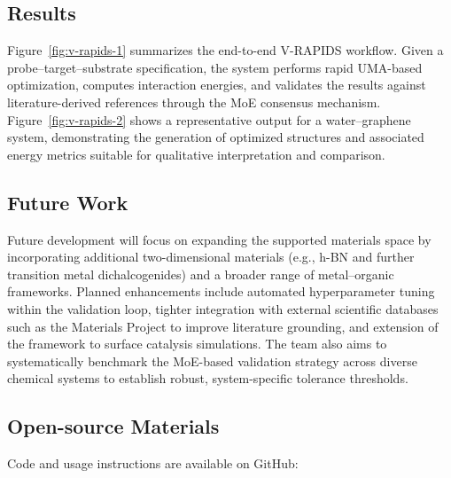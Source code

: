 \subsection*{Results}

Figure~\ref{fig:v-rapids-1} summarizes the end-to-end V-RAPIDS workflow. Given a probe–target–substrate specification, the system performs rapid UMA-based optimization, computes interaction energies, and validates the results against literature-derived references through the MoE consensus mechanism. Figure~\ref{fig:v-rapids-2} shows a representative output for a water–graphene system, demonstrating the generation of optimized structures and associated energy metrics suitable for qualitative interpretation and comparison.

\subsection*{Future Work}

Future development will focus on expanding the supported materials space by incorporating additional two-dimensional materials (e.g., h-BN and further transition metal dichalcogenides) and a broader range of metal–organic frameworks. Planned enhancements include automated hyperparameter tuning within the validation loop, tighter integration with external scientific databases such as the Materials Project to improve literature grounding, and extension of the framework to surface catalysis simulations. The team also aims to systematically benchmark the MoE-based validation strategy across diverse chemical systems to establish robust, system-specific tolerance thresholds.

\subsection*{Open-source Materials}
Code and usage instructions are available on GitHub: 






